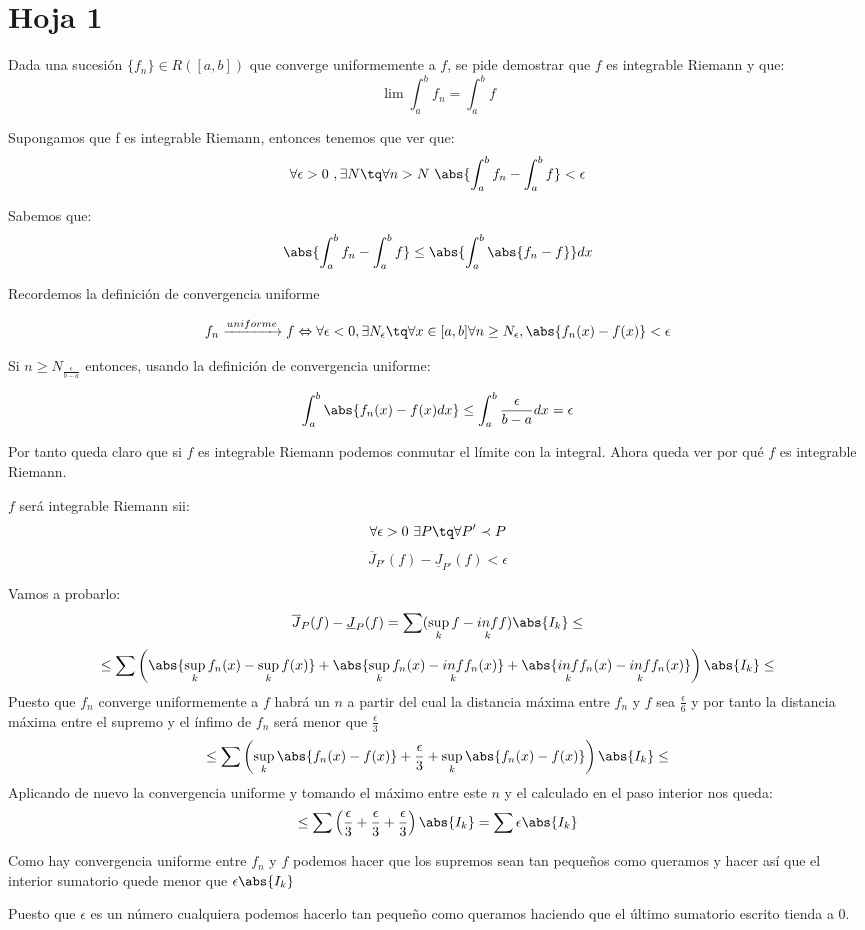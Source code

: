 \section{Hoja 1}
\begin{problem}[5]
Dada una sucesión $\lbrace f_n \rbrace \in R([a,b])$ que converge uniformemente a $f$, se pide demostrar que $f$ es integrable Riemann y que:
\[ \lim \int_{a}^{b} f_n = \int_{a}^{b} f \]

\solution
Supongamos que f es integrable Riemann, entonces tenemos que ver que:
\[ \forall \epsilon > 0 \ , \exists N \tq \forall n> N \ \abs{\int_a^b f_n - \int_a^b f} < \epsilon\]

Sabemos que:
\[\abs{\int_a^b f_n - \int_a^b f} \leq \abs{\int_a^b \abs{f_n -f}} dx\]

Recordemos la definición de convergencia uniforme

\begin{defn}
\[f_n \xrightarrow{uniforme} f \Leftrightarrow \forall \epsilon < 0, \exists N_{\epsilon} \tq \forall x \in [a,b]  \forall n \geq N_{\epsilon}, \abs{f_n (x) - f(x)} < \epsilon\]
\end{defn}

Si $n \geq N_{\frac{\epsilon}{b-a}}$ entonces, usando la definición de convergencia uniforme:

\[\int_a^b \abs{f_n(x) - f(x) dx} \leq \int_a^b \frac{\epsilon}{b-a}dx = \epsilon\]

Por tanto queda claro que si $f$ es integrable Riemann podemos conmutar el límite con la integral. Ahora queda ver por qué $f$ es integrable Riemann.

$f$ será integrable Riemann sii:
\[\forall \epsilon > 0 \ \exists P \tq \forall P' \prec P \]
\[\overline{J}_{P'}(f) - \underline{J}_{P'}(f) < \epsilon\]

Vamos a probarlo:
\[\overline{J}_P(f) - \underline{J}_P(f) = \sum(\sup_k f - \underset{k}{inf} f)\abs{I_k} \leq\]
\[\leq \sum\left( \abs{\sup_{k}f_n(x) - \sup_{k}f(x)} + \abs{\sup_{k}f_n(x) - \underset{k}{inf}f_n(x)} +  \abs{\underset{k}{inf}f_n(x) - \underset{k}{inf}f_n(x)} \right)\abs{I_k} \leq \]
Puesto que $f_n$ converge uniformemente a $f$ habrá un $n$ a partir del cual la distancia máxima entre $f_n$ y $f$ sea $\frac{\epsilon}{6}$ y por tanto la distancia máxima entre el supremo y el ínfimo de $f_n$ será menor que $\frac{\epsilon}{3}$
\[\leq \sum\left( \sup_{k} \abs{f_n(x) - f(x)} + \frac{\epsilon}{3} + \sup_k \abs{f_n(x) - f(x)} \right)\abs{I_k} \leq\]
Aplicando de nuevo la convergencia uniforme y tomando el máximo entre este $n$ y el calculado en el paso interior nos queda:
\[\leq \sum \left(\frac{\epsilon}{3} + \frac{\epsilon}{3} + \frac{\epsilon}{3} \right)\abs{I_k} = \sum\epsilon\abs{I_k}\]

Como hay convergencia uniforme entre $f_n$ y $f$ podemos hacer que los supremos sean tan pequeños como queramos y hacer así que el interior sumatorio quede menor que $\epsilon \abs{I_k}$

Puesto que $\epsilon$ es un número cualquiera podemos hacerlo tan pequeño como queramos haciendo que el último sumatorio escrito tienda a 0.

\end{problem}

